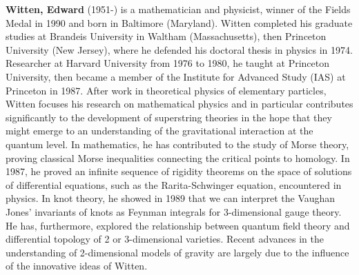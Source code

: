 \textbf{Witten, Edward} (1951-) is a mathematician and physicist, winner of the Fields Medal in 1990 and born in Baltimore (Maryland). Witten completed his graduate studies at Brandeis University in Waltham (Massachusetts), then Princeton University (New Jersey), where he defended his doctoral thesis in physics in 1974. Researcher at Harvard University from 1976 to 1980, he taught at Princeton University, then became a member of the Institute for Advanced Study (IAS) at Princeton in 1987. After work in theoretical physics of elementary particles, Witten focuses his research on mathematical physics and in particular contributes significantly to the development of superstring theories in the hope that they might emerge to an understanding of the gravitational interaction at the quantum level. In mathematics, he has contributed to the study of Morse theory, proving classical Morse inequalities connecting the critical points to homology. In 1987, he proved an infinite sequence of rigidity theorems on the space of solutions of differential equations, such as the Rarita-Schwinger equation, encountered in physics. In knot theory, he showed in 1989 that we can interpret the Vaughan Jones' invariants of knots as Feynman integrals for 3-dimensional gauge theory. He has, furthermore, explored the relationship between quantum field theory and differential topology of 2 or 3-dimensional varieties. Recent advances in the understanding of 2-dimensional models of gravity are largely due to the influence of the innovative ideas of Witten.

{}
\label{sec:Y}

